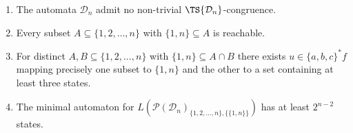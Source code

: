 \begin{proposition}\label{sync_max:prop:Dn}
\begin{enumerate}
\item \label{sync_max:prop:Dn:1} The automata $\mathcal D_n$ admit no non-trivial $\TS{\mathcal D_n}$-congruence.

\item \label{sync_max:prop:Dn:item:reach} Every subset $A \subseteq \{1,2,\ldots,n\}$ with $\{1,n\} \subseteq A$ is reachable.

\item \label{sync_max:prop:Dn:item:dist} For distinct $A,B \subseteq \{1,2,\ldots,n\}$ with $\{ 1,n \} \subseteq A \cap B$
 there exists $u \in \{a,b,c\}^*f$ mapping precisely one subset to  $\{1,n\}$
 and the other to a set containing at least three states.
 
\item \label{sync_max:prop:Dn:4} The minimal automaton for $L(\mathcal P(\mathcal D_n)_{\{1,2,\ldots,n\}, \{ \{1,n\}\}})$
 has at least $2^{n-2}$ states.
\end{enumerate}
\end{proposition}
